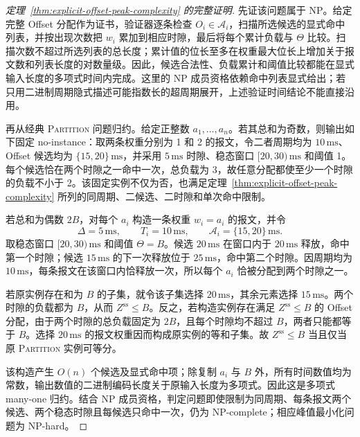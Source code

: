 \documentclass[UTF8,a4paper,twoside,zihao=-4]{ctexart}
\numberwithin{equation}{section}
\numberwithin{figure}{section}
\numberwithin{table}{section}
\theoremstyle{definition}
\newcommand{\Oset}{\mathcal{A}}
\numberwithin{algocf}{section}
\begin{document}
\begin{proof}[定理~\ref{thm:explicit-offset-peak-complexity} 的完整证明]
先证该问题属于 NP。给定完整 Offset 分配作为证书，验证器逐条检查 $O_i\in\Oset_i$，扫描所选候选的显式命中列表，并按出现次数把 $w_i$ 累加到相应时隙，最后将每个累计负载与 $\Theta$ 比较。扫描次数不超过所选列表的总长度；累计值的位长至多在权重最大位长上增加关于报文数和列表长度的对数量级。因此，候选合法性、负载累计和阈值比较都能在显式输入长度的多项式时间内完成。这里的 NP 成员资格依赖命中列表显式给出；若只用二进制周期隐式描述可能指数长的超周期展开，上述验证时间结论不能直接沿用。

再从经典 \textsc{Partition} 问题归约\cite{karp1972}。给定正整数 $a_1,\ldots,a_n$。若其总和为奇数，则输出如下固定 no-instance：取两条权重分别为 1 和 2 的报文，令二者周期均为 $10\,\mathrm{ms}$、Offset 候选均为 $\{15,20\}\,\mathrm{ms}$，并采用 $5\,\mathrm{ms}$ 时隙、稳态窗口 $[20,30)\,\mathrm{ms}$ 和阈值 1。每个候选恰在两个时隙之一命中一次，总负载为 3，故任意分配都使至少一个时隙的负载不小于 2。该固定实例不仅为否，也满足定理~\ref{thm:explicit-offset-peak-complexity} 所列的同周期、二候选、二时隙和单次命中限制。

若总和为偶数 $2B$，对每个 $a_i$ 构造一条权重 $w_i=a_i$ 的报文，并令
\begin{equation}
 \Delta=5\,\mathrm{ms},\qquad
 T_i=10\,\mathrm{ms},\qquad
 \Oset_i=\{15,20\}\,\mathrm{ms}.
\label{eq:appendix-partition-construction}
\end{equation}
取稳态窗口 $[20,30)\,\mathrm{ms}$ 和阈值 $\Theta=B$。候选 $20\,\mathrm{ms}$ 在窗口内于 $20\,\mathrm{ms}$ 释放，命中第一个时隙；候选 $15\,\mathrm{ms}$ 的下一次释放位于 $25\,\mathrm{ms}$，命中第二个时隙。因周期均为 $10\,\mathrm{ms}$，每条报文在该窗口内恰释放一次，所以每个 $a_i$ 恰被分配到两个时隙之一。

若原实例存在和为 $B$ 的子集，就令该子集选择 $20\,\mathrm{ms}$，其余元素选择 $15\,\mathrm{ms}$。两个时隙的负载都为 $B$，从而 $Z^{\mathrm{ss}}\le B$。反之，若构造实例存在满足 $Z^{\mathrm{ss}}\le B$ 的 Offset 分配，由于两个时隙的总负载固定为 $2B$，且每个时隙均不超过 $B$，两者只能都等于 $B$。选择 $20\,\mathrm{ms}$ 的报文权重因而构成原实例的等和子集。故 $Z^{\mathrm{ss}}\le B$ 当且仅当原 \textsc{Partition} 实例可等分。

该构造产生 $O(n)$ 个候选及显式命中项；除复制 $a_i$ 与 $B$ 外，所有时间数值均为常数，输出数值的二进制编码长度关于原输入长度为多项式。因此这是多项式 many-one 归约。结合 NP 成员资格，判定问题即使限制为同周期、每条报文两个候选、两个稳态时隙且每候选只命中一次，仍为 NP-complete；相应峰值最小化问题为 NP-hard。
\end{proof}
\end{document}

